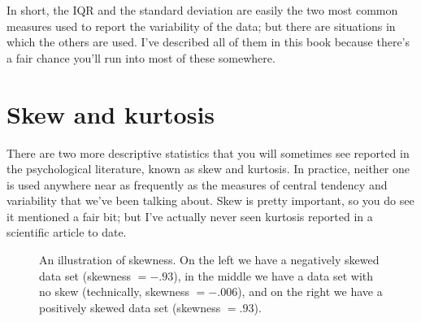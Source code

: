 \noindent
In short, the IQR and the standard deviation are easily the two most common measures used to report the variability of the data; but there are situations in which the others are used. I've described all of them in this book because there's a fair chance you'll run into most of these somewhere.

\section{Skew and kurtosis \label{sec:skew}\label{sec:kurtosis}}

There are two more descriptive statistics that you will sometimes see reported in the psychological literature, known as skew and kurtosis. In practice, neither one is used anywhere near as frequently as the measures of central tendency and variability that we've been talking about. Skew is pretty important, so you do see it mentioned a fair bit; but I've actually never seen kurtosis reported in a scientific article to date. 


\begin{figure}[h]
\begin{center}
\caption{An illustration of skewness. On the left we have a negatively skewed data set (skewness $= -.93$), in the middle we have a data set with no skew (technically, skewness $= -.006$), and on the right we have a positively skewed data set (skewness $= .93$).  }
\label{fig:skewness}
\HR
\end{center}
\end{figure}

